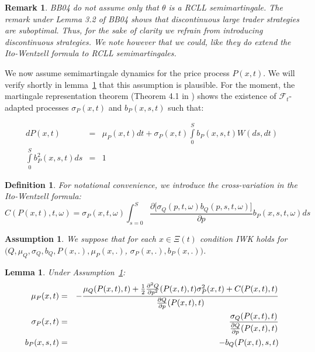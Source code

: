 \documentclass{article}
\newtheorem{lemma}[theorem]{Lemma}
\newtheorem{definition}[theorem]{Definition}
\newtheorem{remark}[theorem]{Remark}
\newtheorem{assumption}[theorem]{Assumption}
\begin{document}

\begin{remark}
BB04 do not assume only that $\theta$ is a RCLL semimartingale. The remark
under Lemma 3.2 of BB04 shows that discontinuous large trader strategies are
suboptimal. Thus, for the sake of clarity we refrain from introducing
discontinuous strategies. We note however that we could, like they do extend
the Ito-Wentzell formula to RCLL semimartingales.
\end{remark}

\bigskip

We now assume semimartingale dynamics for the price process $P(x,t)$. We
will verify shortly in lemma~\ref{lemma::para} that this assumption is plausible. For the
moment, the martingale representation theorem (Theorem 4.1 in \cite{CT06})
shows the existence of $\mathcal{F}_{t}$-adapted processes $\sigma _{P}(x,t)$
and $b_{P}(x,s,t)$ such that:

\begin{eqnarray}
dP(x,t) &=&\mu _{P}(x,t)dt+\sigma
_{P}(x,t)\int\limits_{0}^{S}b_{P}(x,s,t)W(ds,dt)  \label{equforP} \\
\int\limits_{0}^{S}b_{P}^{2}(x,s,t)ds &=&1
\end{eqnarray}

\begin{definition}
For notational convenience, we introduce the
cross-variation in the Ito-Wentzell formula:%
\begin{equation*}
C(P(x,t),t,\omega )=\sigma _{P}(x,t,\omega )\int_{s=0}^{S}\frac{\partial
\lbrack \sigma _{Q}(p,t,\omega )b_{Q}(p,s,t,\omega )]}{\partial p}%
b_{P}(x,s,t,\omega )ds
\end{equation*}
\end{definition}

\begin{assumption}\label{ass::iwk_condition_Q}
We suppose that for each $x\in \Xi (t)$ condition IWK holds for $(Q,\mu
_{Q},\sigma _{Q},b_{Q},P(x,.),\mu _{P}(x,.)$, $\sigma _{P}(x,.),b_{P}(x,.))$.
\end{assumption}



\begin{lemma} \label{lemma::para}
Under Assumption~\ref{ass::iwk_condition_Q}:
\begin{eqnarray}
\mu _{P}(x,t) &=&-\frac{\mu _{Q}(P(x,t),t)+\frac{1}{2}\frac{\partial ^{2}Q}{%
\partial p^{2}}(P(x,t),t)\sigma _{P}^{2}(x,t)+C(P(x,t),t)}{\frac{\partial Q}{%
\partial p}(P(x,t),t)}  \label{mu_Px} \\
\sigma _{P}(x,t) &=&\frac{\sigma _{Q}(P(x,t),t)}{\frac{\partial Q}{\partial p%
}(P(x,t),t)}  \label{sigma_P} \\
b_{P}(x,s,t) &=&-b_{Q}(P(x,t),s,t)  \label{b_P}
\end{eqnarray}
\end{lemma}
\end{document}
